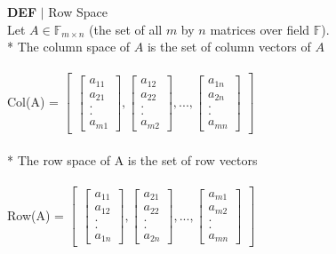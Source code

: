\documentclass [12pt]{article}
\begin{document}
\begin{framed}
\pagebreak
\noindent\textbf{DEF} $|$ Row Space\\
Let $A\in\mathbb{F}_{m\times n}$ (the set of all $m$ by $n$ matrices over field $\mathbb{F}$).\\
* The column space of $A$ is the set of column vectors of $A$\\\\
Col(A) = $\begin{bmatrix}
\begin{bmatrix}
a_{11}\\
a_{21}\\
.\\
.\\
a_{m1}
\end{bmatrix}
,
\begin{bmatrix}
a_{12}\\
a_{22}\\
.\\
.\\
a_{m2}
\end{bmatrix}
,
...
,
\begin{bmatrix}
a_{1n}\\
a_{2n}\\
.\\
.\\
a_{mn}
\end{bmatrix}
\end{bmatrix}$\\\\
* The row space of A is the set of row vectors\\\\
Row(A) = $\begin{bmatrix}
\begin{bmatrix}
a_{11}\\
a_{12}\\
.\\
.\\
a_{1n}
\end{bmatrix}
,
\begin{bmatrix}
a_{21}\\
a_{22}\\
.\\
.\\
a_{2n}
\end{bmatrix}
,
...
,
\begin{bmatrix}
a_{m1}\\
a_{m2}\\
.\\
.\\
a_{mn}
\end{bmatrix}
\end{bmatrix}$\\\\
\end{framed}
\end{document}
